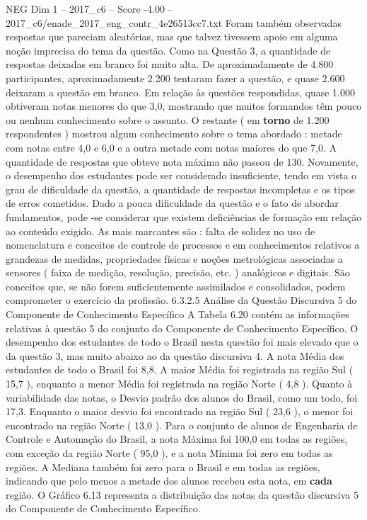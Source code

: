 \begin{textsample}{NEG Dim 1 – 2017\_c6 – Score -4.00 – 2017\_c6/enade\_2017\_eng\_contr\_4e26513cc7.txt}
Foram também observadas respostas que pareciam aleatórias, mas que talvez tivessem apoio em alguma noção imprecisa do tema da questão.
Como na Questão 3, a quantidade de respostas deixadas em branco foi muito alta.
De aproximadamente de 4.800 participantes, aproximadamente 2.200 tentaram fazer a questão, e quase 2.600 deixaram a questão em branco.
Em relação às questões respondidas, quase 1.000 obtiveram notas menores do que 3,0, mostrando que muitos formandos têm pouco ou nenhum conhecimento sobre o assunto.
O restante ( em \textbf{torno} de 1.200 respondentes ) mostrou algum conhecimento sobre o tema abordado : metade com notas entre 4,0 e 6,0 e a outra metade com notas maiores do que 7,0.
A quantidade de respostas que obteve nota máxima não passou de 130.
Novamente, o desempenho dos estudantes pode ser considerado insuficiente, tendo em vista o grau de dificuldade da questão, a quantidade de respostas incompletas e os tipos de erros cometidos.
Dado a pouca dificuldade da questão e o fato de abordar fundamentos, pode -se considerar que existem deficiências de formação em relação ao conteúdo exigido.
As mais marcantes são : falta de solidez no uso de nomenclatura e conceitos de controle de processos e em conhecimentos relativos a grandezas de medidas, propriedades físicas e noções metrológicas associadas a sensores ( faixa de medição, resolução, precisão, etc. ) analógicos e digitais.
São conceitos que, se não forem suficientemente assimilados e consolidados, podem comprometer o exercício da profissão. 6.3.2.5 Análise da Questão Discursiva 5 do Componente de Conhecimento Específico A Tabela 6.20 contém as informações relativas à questão 5 do conjunto do Componente de Conhecimento Específico.
O desempenho dos estudantes de todo o Brasil nesta questão foi mais elevado que o da questão 3, mas muito abaixo ao da questão discursiva 4.
A nota Média dos estudantes de todo o Brasil foi 8,8.
A maior Média foi registrada na região Sul ( 15,7 ), enquanto a menor Média foi registrada na região Norte ( 4,8 ).
Quanto à variabilidade das notas, o Desvio padrão dos alunos do Brasil, como um todo, foi 17,3.
Enquanto o maior desvio foi encontrado na região Sul ( 23,6 ), o menor foi encontrado na região Norte ( 13,0 ).
Para o conjunto de alunos de Engenharia de Controle e Automação do Brasil, a nota Máxima foi 100,0 em todas as regiões, com exceção da região Norte ( 95,0 ), e a nota Mínima foi zero em todas as regiões.
A Mediana também foi zero para o Brasil e em todas as regiões, indicando que pelo menos a metade dos alunos recebeu esta nota, em \textbf{cada} região.
O Gráfico 6.13 representa a distribuição das notas da questão discursiva 5 do Componente de Conhecimento Específico.

\end{textsample}
